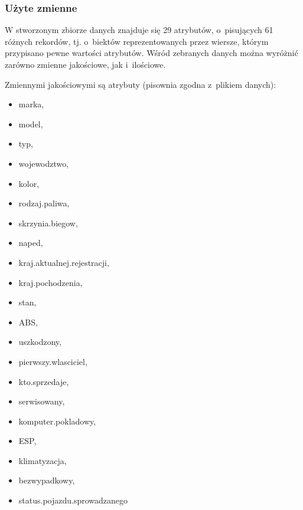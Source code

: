 \documentclass[12pt,a4paper]{report}
\begin{document}
\subsubsection{Użyte zmienne}


W stworzonym zbiorze danych znajduje się 29 atrybutów, o~pisujących 61 różnych rekordów, tj. o~biektów reprezentowanych przez wiersze, którym przypisano pewne wartości atrybutów. Wśród zebranych danych można wyróżnić zarówno zmienne jakościowe, jak i~ilościowe. 

Zmiennymi jakościowymi są atrybuty (pisownia zgodna z~plikiem danych):
\begin{multicols}{3} 
\begin{itemize}
	\item marka,
	\item model,
	\item typ,
	\item wojewodztwo,
	\item kolor,
	\item rodzaj.paliwa,
	\item skrzynia.biegow,
	\item naped,
	\item kraj.aktualnej.rejestracji,%
	\item kraj.pochodzenia,%
	\item stan,
	\item ABS,
	\item uszkodzony,
	\item pierwszy.wlasciciel,%
	\item kto.sprzedaje,%
	\item serwisowany,%
	\item komputer.pokladowy,%
	\item ESP,
	\item klimatyzacja,%
	\item bezwypadkowy,%
	\item status.pojazdu.sprowadzanego%
\end{itemize}
\end{multicols}

%
\end{document}

